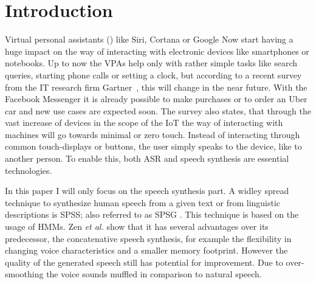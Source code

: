 

\section{Introduction}
\label{sec:introduction}

Virtual personal assistants () like Siri, Cortana or Google Now start having a huge impact on the way of interacting with electronic devices like smartphones or notebooks. Up to now the \acp{VPA} help only with rather simple tasks like search queries, starting phone calls or setting a clock, but according to a recent survey from the IT research firm Gartner~\cite{gartner:assistants}, this will change in the near future. With the Facebook Messenger it is already possible to make purchases or to order an Uber car and new use cases are expected soon. The survey also states, that through the vast increase of devices in the scope of the \ac{IoT} the way of interacting with machines will go towards minimal or zero touch. Instead of interacting through common touch-displays or buttons, the user simply speaks to the device, like to another person. To enable this, both \ac{ASR} and speech synthesis are essential technologies.

In this paper I will only focus on the speech synthesis part. A widley spread technique to synthesize human speech from a given text or from linguistic descriptions is \ac{SPSS}; also referred to as \ac{SPSG} \cite{ling:deep}. This technique is based on the usage of \acp{HMM}. Zen \textsl{et al.} \cite{zen:statistical} show that it has several advantages over its predecessor, the concatenative speech synthesis, for example the flexibility in changing voice characteristics and a smaller memory footprint. However the quality of the generated speech still has potential for improvement. Due to over-smoothing the voice sounds muffled in comparison to natural speech.

